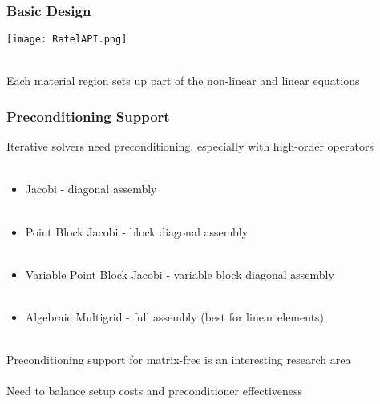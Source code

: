 \documentclass{beamer}
\begin{document}

\begin{frame}
\begin{center}
\frametitle{Basic Design}

\texttt{[image: RatelAPI.png]}

~\\

Each material region sets up part of the non-linear and linear equations\\

\end{center}
\end{frame}


\begin{frame}
\begin{center}
\frametitle{Preconditioning Support}

Iterative solvers need preconditioning, especially with high-order operators\\

~\\

\begin{itemize}

\item Jacobi - diagonal assembly\\

~\\

\item Point Block Jacobi - block diagonal assembly\\

~\\

\item Variable Point Block Jacobi - variable block diagonal assembly\\

~\\

\item Algebraic Multigrid - full assembly (best for linear elements)\\

\end{itemize}

~\\

Preconditioning support for matrix-free is an interesting research area\\

~\\

Need to balance setup costs and preconditioner effectiveness

\end{center}
\end{frame}
\end{document}
